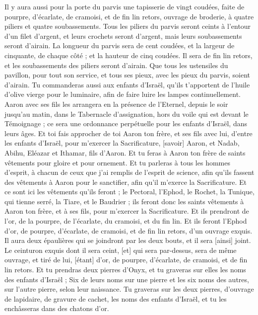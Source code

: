 \begin{multicols}{2}
Il y aura aussi pour la porte du parvis une tapisserie de vingt coudées, faite de pourpre, d'écarlate, de cramoisi, et de fin lin retors, ouvrage de broderie, à quatre piliers et quatre soubassements.
Tous les piliers du parvis seront ceints à l'entour d'un filet d'argent, et leurs crochets seront d'argent, mais leurs soubassements seront d'airain.
La longueur du parvis sera de cent coudées, et la largeur de cinquante, de chaque côté ; et la hauteur de cinq coudées. Il sera de fin lin retors, et les soubassements des piliers seront d'airain.
Que tous les ustensiles du pavillon, pour tout son service, et tous ses pieux, avec les pieux du parvis, soient d'airain.
Tu commanderas aussi aux enfants d'Israël, qu'ils t'apportent de l'huile d'olive vierge pour le luminaire, afin de faire luire les lampes continuellement.
Aaron avec ses fils les arrangera en la présence de l'Eternel, depuis le soir jusqu'au matin, dans le Tabernacle d'assignation, hors du voile qui est devant le Témoignage ; ce sera une ordonnance perpétuelle pour les enfants d'Israël, dans leurs âges.
\VerseOne{}Et toi fais approcher de toi Aaron ton frère, et ses fils avec lui, d'entre les enfants d'Israël, pour m'exercer la Sacrificature, [savoir] Aaron, et Nadab, Abihu, Eléazar et Ithamar, fils d'Aaron.
Et tu feras à Aaron ton frère de saints vêtements pour gloire et pour ornement.
Et tu parleras à tous les hommes d'esprit, à chacun de ceux que j'ai remplis de l'esprit de science, afin qu'ils fassent des vêtements à Aaron pour le sanctifier, afin qu'il m'exerce la Sacrificature.
Et ce sont ici les vêtements qu'ils feront ; le Pectoral, l'Ephod, le Rochet, la Tunique, qui tienne serré, la Tiare, et le Baudrier ; ils feront donc les saints vêtements à Aaron ton frère, et à ses fils, pour m'exercer la Sacrificature.
Et ils prendront de l'or, de la pourpre, de l'écarlate, du cramoisi, et du fin lin.
Et ils feront l'Ephod d'or, de pourpre, d'écarlate, de cramoisi, et de fin lin retors, d'un ouvrage exquis.
Il aura deux épaulières qui se joindront par les deux bouts, et il sera [ainsi] joint.
Le ceinturon exquis dont il sera ceint, [et] qui sera par-dessus, sera de même ouvrage, et tiré de lui, [étant] d'or, de pourpre, d'écarlate, de cramoisi, et de fin lin retors.
Et tu prendras deux pierres d'Onyx, et tu graveras sur elles les noms des enfants d'Israël ;
Six de leurs noms sur une pierre et les six noms des autres, sur l'autre pierre, selon leur naissance.
Tu graveras sur les deux pierres, d'ouvrage de lapidaire, de gravure de cachet, les noms des enfants d'Israël, et tu les enchâsseras dans des chatons d'or.

\end{multicols}
